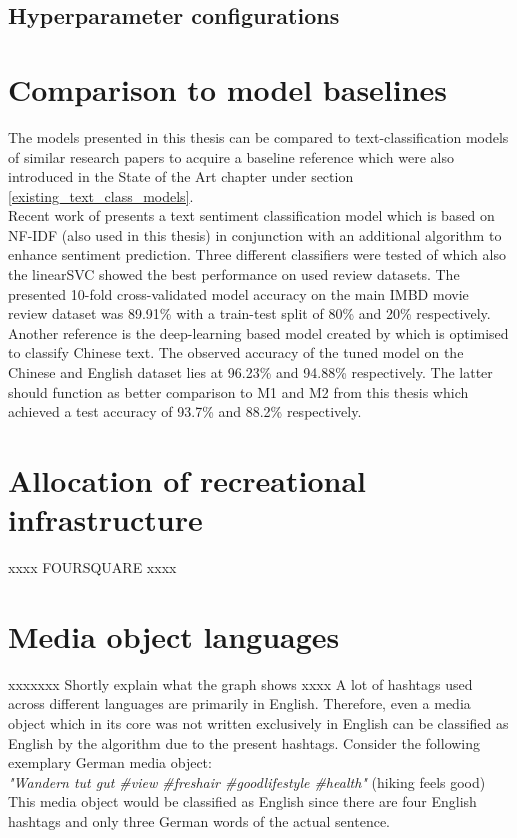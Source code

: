 \subsection{Hyperparameter configurations}


\section{Comparison to model baselines} \label{model_baseline}
The models presented in this thesis can be compared to text-classification models of similar research papers to acquire a baseline reference which were also introduced in the State of the Art chapter under section \ref{existing_text_class_models}. \\
Recent work of \textcite{Das2018} presents a text sentiment classification model which is based on NF-IDF (also used in this thesis) in conjunction with an additional algorithm to enhance sentiment prediction. Three different classifiers were tested of which also the linearSVC showed the best performance on used review datasets. The presented 10-fold cross-validated model accuracy on the main IMBD movie review dataset was 89.91\% with a train-test split of 80\% and 20\% respectively.\\
Another reference is the deep-learning based model created by \textcite{Li2018} which is optimised to classify Chinese text. The observed accuracy of the tuned model on the Chinese and English dataset lies at 96.23\% and 94.88\% respectively. The latter should function as better comparison to M1 and M2 from this thesis which achieved a test accuracy of 93.7\% and 88.2\% respectively.

\section{Allocation of recreational infrastructure} \label{discussion_foursquare}
xxxx FOURSQUARE xxxx

\section{Media object languages}
xxxxxxx Shortly explain what the graph shows xxxx
A lot of hashtags used across different languages are primarily in English. Therefore, even a media object which in its core was not written exclusively in English can be classified as English by the algorithm due to the present hashtags. Consider the following exemplary German media object: \\ \textit{"Wandern tut gut \#view \#freshair \#goodlifestyle \#health"} (hiking feels good) \\ This media object would be classified as English since there are four English hashtags and only three German words of the actual sentence.

